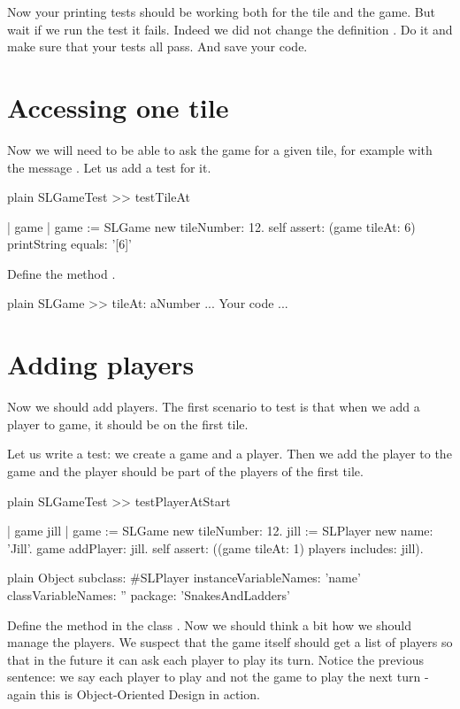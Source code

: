 \documentclass[10pt,twoside,english]{_support/latex/sbabook/sbabook}
\begin{document}
Now your printing tests should be working both for the tile and the game. 
But wait if we run the test  it fails.
Indeed we did not change the definition .
Do it and make sure that your tests all pass. And save your code. 
\section{Accessing one tile}
Now we will need to be able to ask the game for a given tile, for example with the message . Let us add a test for it. 

\begin{displaycode}{plain}
SLGameTest >> testTileAt

	| game |
	game := SLGame new tileNumber: 12.
	self assert: (game tileAt: 6) printString equals: '[6]'
\end{displaycode}

Define the method .

\begin{displaycode}{plain}
SLGame >> tileAt: aNumber
	... Your code ...
\end{displaycode}
\section{Adding players}
Now we should add players. The first scenario to test is that when we add a player to game, it should be on the first tile.

Let us write a test: we create a game and a player. Then we add the player to the game and the player should be part of the players of the first tile. 

\begin{displaycode}{plain}
SLGameTest >> testPlayerAtStart

	| game jill |
	game := SLGame new tileNumber: 12.
	jill := SLPlayer new name: 'Jill'.
	game addPlayer: jill. 
	self assert: ((game tileAt: 1) players includes: jill).
\end{displaycode}

\begin{displaycode}{plain}
Object subclass: #SLPlayer
	instanceVariableNames: 'name'
	classVariableNames: ''
	package: 'SnakesAndLadders'
\end{displaycode}

Define the method  in the class .
Now we should think a bit how we should manage the players. 
We suspect that the game itself should get a list of players so that in the future it can ask each player to play its turn. Notice the previous sentence: we say each player to play and not the game to play the next turn - again this is Object-Oriented Design in action.
\end{document}

